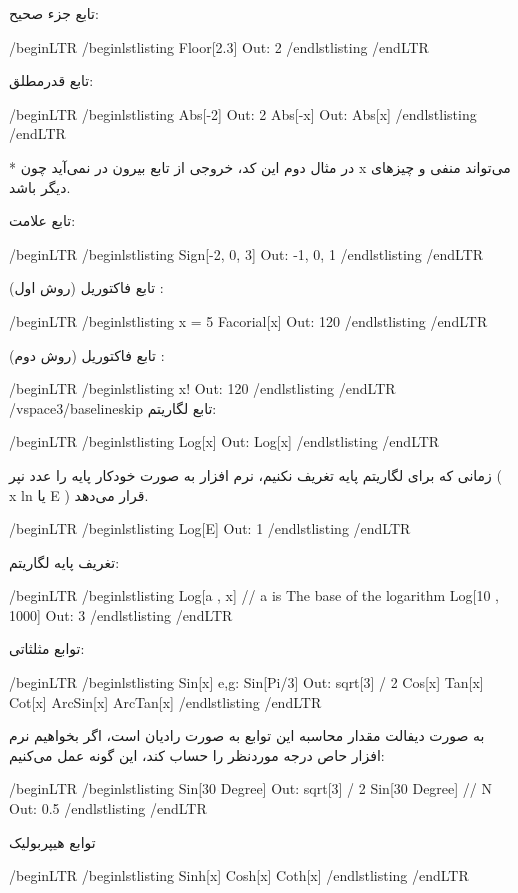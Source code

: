 تابع جزء صحیح:

/begin{LTR}
/begin{lstlisting}
Floor[2.3]             Out: 2
/end{lstlisting}
/end{LTR}

تابع قدرمطلق:

/begin{LTR}
/begin{lstlisting}
Abs[-2]                         Out: 2
Abs[-x]                         Out: Abs[x]
/end{lstlisting}
/end{LTR}

* در مثال دوم این کد، خروجی از تابع بیرون در نمی‌آید چون x می‌تواند منفی و چیزهای دیگر باشد.

تابع علامت:

/begin{LTR}
/begin{lstlisting}
Sign[{-2, 0, 3}]                         Out: {-1, 0, 1}
/end{lstlisting}
/end{LTR}

تابع فاکتوریل (روش اول) :

/begin{LTR}
/begin{lstlisting}
x = 5
Facorial[x]                       Out: 120
/end{lstlisting}
/end{LTR}

تابع فاکتوریل (روش دوم) :

/begin{LTR}
/begin{lstlisting}
x!                Out: 120
/end{lstlisting}
/end{LTR}
/vspace{3/baselineskip} 
تابع لگاریتم:

/begin{LTR}
/begin{lstlisting}
Log[x]                Out: Log[x]
/end{lstlisting}
/end{LTR}

زمانی که برای لگاریتم پایه تغریف نکنیم، نرم افزار به صورت خودکار پایه را عدد نپر ( x ln  یا E ) قرار می‌دهد.

/begin{LTR}
/begin{lstlisting}
Log[E]               Out: 1
/end{lstlisting}
/end{LTR}

تغریف پایه لگاریتم:

/begin{LTR}
/begin{lstlisting}
Log[a , x]                  // a is The base of the logarithm
Log[10 , 1000]                Out: 3
/end{lstlisting}
/end{LTR}

توابع مثلثاتی:

/begin{LTR}
/begin{lstlisting}
Sin[x]                e,g: Sin[Pi/3]                Out: sqrt[3] / 2
Cos[x]
Tan[x]
Cot[x]
ArcSin[x]
ArcTan[x]
/end{lstlisting}
/end{LTR}

به صورت دیفالت مقدار محاسبه این توابع به صورت رادیان است، اگر بخواهیم نرم افزار حاص درجه موردنظر را حساب کند، این گونه عمل می‌کنیم:

/begin{LTR}
/begin{lstlisting}
Sin[30 Degree]                Out: sqrt[3] / 2
Sin[30 Degree] // N           Out: 0.5
/end{lstlisting}
/end{LTR}

توابع هیپربولیک

/begin{LTR}
/begin{lstlisting}
Sinh[x]
Cosh[x]
Coth[x]
/end{lstlisting}
/end{LTR}

